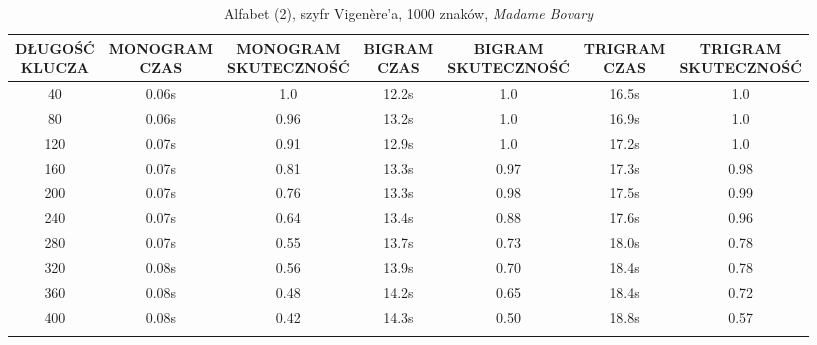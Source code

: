 \documentclass[a4paper]{article}
\theoremstyle{defn}
\theoremstyle{theorem}
\theoremstyle{lemma}
\theoremstyle{cor}
\theoremstyle{fact}
\begin{document}
\begin{center}\begin{small}\begin{longtable}{|c|c|c|c|c|c|c|}
\hline \makecell{DŁUGOŚĆ\\KLUCZA} &  \makecell{MONOGRAM\\CZAS} & \makecell{MONOGRAM\\SKUTECZNOŚĆ} & \makecell{BIGRAM\\CZAS} &  \makecell{BIGRAM\\SKUTECZNOŚĆ} & \makecell{TRIGRAM\\CZAS} & \makecell{TRIGRAM\\SKUTECZNOŚĆ}\\ \hline
40 & 0.06s & 1.0 & 12.2s & 1.0 & 16.5s & 1.0 \\ \hline
80 & 0.06s & 0.96 & 13.2s & 1.0 & 16.9s & 1.0 \\ \hline
120 & 0.07s & 0.91 & 12.9s & 1.0 & 17.2s & 1.0 \\ \hline
160 & 0.07s & 0.81 & 13.3s & 0.97 & 17.3s & 0.98 \\ \hline
200 & 0.07s & 0.76 & 13.3s & 0.98 & 17.5s & 0.99 \\ \hline
240 & 0.07s & 0.64 & 13.4s & 0.88 & 17.6s & 0.96 \\ \hline
280 & 0.07s & 0.55 & 13.7s & 0.73 & 18.0s & 0.78 \\ \hline
320 & 0.08s & 0.56 & 13.9s & 0.70 & 18.4s & 0.78 \\ \hline
360 & 0.08s & 0.48 & 14.2s & 0.65 & 18.4s & 0.72 \\ \hline
400 & 0.08s & 0.42 & 14.3s & 0.50 & 18.8s & 0.57 \\ \hline
\caption{Alfabet (2), szyfr Vigenère'a, 1000 znaków, \textit{Madame Bovary}}
\end{longtable}\end{small}\end{center}
\end{document}
